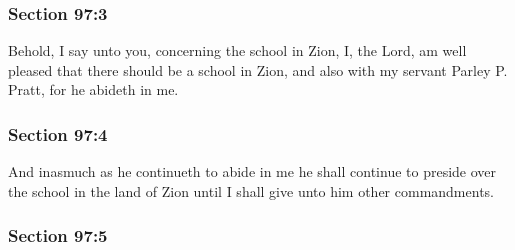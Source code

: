 
	\subsubsection{Section 97:3} %
		\label{DC97-3}

		Behold, I say unto you, concerning the school in Zion, I, the Lord, am well pleased that there should be a school in Zion, and also with my servant Parley P. Pratt, for he abideth in me.


	\subsubsection{Section 97:4} %
		\label{DC97-4}

		And inasmuch as he continueth to abide in me he shall continue to preside over the school in the land of Zion until I shall give unto him other commandments.


	\subsubsection{Section 97:5} %
		\label{DC97-5}

